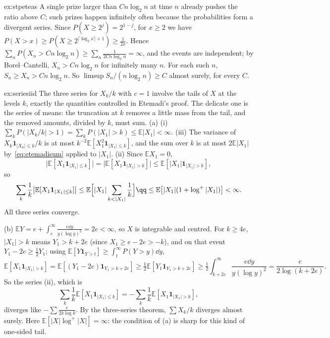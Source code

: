 \begin{solution}{ex:stpeteas}
\idea A single prize larger than $Cn\log_2n$ at time $n$ already pushes the ratio above $C$; such prizes happen infinitely often because the
probabilities form a divergent series.
\writeup Since $P(X\ge2^j)=2^{1-j}$, for $x\ge2$ we have $P(X>x)\ge P(X\ge2^{\lceil\log_2x\rceil+1})\ge\frac1{2x}$. Hence
$\sum_nP(X_n>Cn\log_2n)\ge\sum_n\frac1{2Cn\log_2n}=\infty$, and the events are independent; by Borel--Cantelli, $X_n>Cn\log_2n$ for infinitely many $n$. For each
such $n$, $S_n\ge X_n>Cn\log_2n$. So $\limsup S_n/(n\log_2n)\ge C$ almost surely, for every $C$.
\end{solution}

\begin{solution}{ex:seriesiid}
\idea The three series for $X_k/k$ with $c=1$ involve the tails of $X$ at the levels $k$, exactly the quantities controlled in Etemadi's proof. The
delicate one is the series of means: the truncation at $k$ removes a little mass from the tail, and the removed amounts, divided by $k$, must sum.
\writeup (a) (i) $\sum_kP(|X_k/k|>1)=\sum_kP(|X_1|>k)\le\mathbb E|X_1|<\infty$. (iii) The variance of $X_k\mathbf 1_{|X_k|\le k}/k$ is at most $k^{-2}\mathbb E[X_1^2\mathbf 1_{|X_1|\le k}]$,
and the sum over $k$ is at most $2\mathbb E|X_1|$ by~\eqref{eq:etemadisum} applied to $|X_1|$. (ii) Since $\mathbb E X_1=0$,
\[
\bigl|\mathbb E[X_1\mathbf 1_{|X_1|\le k}]\bigr|=\bigl|\mathbb E[X_1\mathbf 1_{|X_1|>k}]\bigr|\le\mathbb E[|X_1|\mathbf 1_{|X_1|>k}],
\]
so
\[
\begin{gathered}
\sum_k\frac1k\bigl|\mathbb E[X_1\mathbf 1_{|X_1|\le k}]\bigr|\le\mathbb E\Bigl[|X_1|\sum_{k<|X_1|}\frac1k\Bigr]\qq\le\mathbb E\bigl[|X_1|(1+\log^+|X_1|)\bigr]<\infty.
\end{gathered}
\]
All three series converge.

(b) $\mathbb E Y=e+\int_e^\infty\frac{e\dd y}{y(\log y)^2}=2e<\infty$, so $X$ is integrable and centred. For $k\ge4e$, $|X_1|>k$ means $Y_1>k+2e$ (since $X_1\ge e-2e>-k$), and on that event
$Y_1-2e\ge\frac12Y_1$; using $\mathbb E[Y\mathbf 1_{Y>t}]\ge\int_t^\infty P(Y>y)\dd y$,
\[
\mathbb E[X_1\mathbf 1_{|X_1|>k}]=\mathbb E[(Y_1-2e)\mathbf 1_{Y_1>k+2e}]\ge\tfrac12\mathbb E[Y_1\mathbf 1_{Y_1>k+2e}]\ge\tfrac12\int_{k+2e}^\infty\frac{e\dd y}{y(\log y)^2}
=\frac e{2\log(k+2e)}.
\]
So the series (ii), which is
\[
\sum_k\frac1k\mathbb E[X_1\mathbf 1_{|X_1|\le k}]=-\sum_k\frac1k\mathbb E[X_1\mathbf 1_{|X_1|>k}],
\]
diverges like $-\sum\frac e{2k\log k}$. By the
three-series theorem, $\sum X_k/k$ diverges almost surely. Here $\mathbb E[|X|\log^+|X|]=\infty$: the condition of (a) is sharp for this kind of one-sided tail.
\end{solution}

